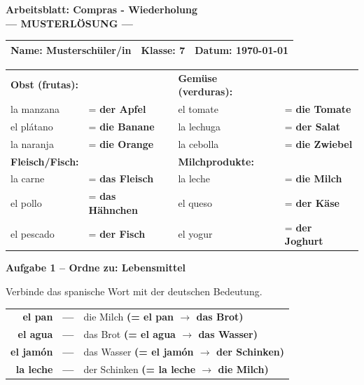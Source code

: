 \documentclass[11pt, a4paper]{article}
\newcommand{\fachfarbe}{spanisch}
\newcommand{\thema}{Compras - Wiederholung}
\newcommand{\klasse}{7}
\newcommand{\datum}{\today}
\newcommand{\punktebox}[1]{\hfill\fbox{\small \_/#1}}
\newcommand{\lsg}[1]{\textcolor{loesung}{\textbf{#1}}}
\newenvironment{aufgabe}[1]{%
    \needspace{5\baselineskip}%
    \nopagebreak[4]%
    \vspace{10pt}
    \noindent\textbf{\textcolor{\fachfarbe}{Aufgabe #1}}
    \nopagebreak[4]%
    \vspace{5pt}
    \nopagebreak[4]%
    \begin{list}{}{\leftmargin=0pt}
    \item[]
}{%
    \end{list}
}
\newcommand{\es}[1]{\textcolor{\fachfarbe}{\textbf{#1}}}
\begin{document}
\begin{center}
    {\Large\bfseries\textcolor{\fachfarbe}{Arbeitsblatt: \thema}}\\[0.3em]
    {\large\textcolor{loesung}{\textbf{--- MUSTERLÖSUNG ---}}}
\end{center}

\vspace{5pt}

\noindent
\begin{tabularx}{\textwidth}{|X|X|X|}
\hline
\textbf{Name:} \lsg{Musterschüler/in} &
\textbf{Klasse:} \klasse &
\textbf{Datum:} \datum \\
\hline
\end{tabularx}

\vspace{15pt}

\begin{merkkasten}

\begin{tabular}{ll|ll}
\textbf{Obst (frutas):} & & \textbf{Gemüse (verduras):} & \\[0.3em]
la manzana & = \lsg{der Apfel} & el tomate & = \lsg{die Tomate} \\[0.3em]
el plátano & = \lsg{die Banane} & la lechuga & = \lsg{der Salat} \\[0.3em]
la naranja & = \lsg{die Orange} & la cebolla & = \lsg{die Zwiebel} \\[0.8em]
\textbf{Fleisch/Fisch:} & & \textbf{Milchprodukte:} & \\[0.3em]
la carne & = \lsg{das Fleisch} & la leche & = \lsg{die Milch} \\[0.3em]
el pollo & = \lsg{das Hähnchen} & el queso & = \lsg{der Käse} \\[0.3em]
el pescado & = \lsg{der Fisch} & el yogur & = \lsg{der Joghurt} \\
\end{tabular}

\end{merkkasten}

\vspace{10pt}

\begin{aufgabe}{1 -- Ordne zu: Lebensmittel}
Verbinde das spanische Wort mit der deutschen Bedeutung. \punktebox{4}
\end{aufgabe}

\begin{center}
\begin{tabular}{rcl}
\es{el pan} & \lsg{---} & die Milch \lsg{(= el pan $\rightarrow$ das Brot)} \\[0.8em]
\es{el agua} & \lsg{---} & das Brot \lsg{(= el agua $\rightarrow$ das Wasser)} \\[0.8em]
\es{el jamón} & \lsg{---} & das Wasser \lsg{(= el jamón $\rightarrow$ der Schinken)} \\[0.8em]
\es{la leche} & \lsg{---} & der Schinken \lsg{(= la leche $\rightarrow$ die Milch)} \\
\end{tabular}
\end{center}
\end{document}
